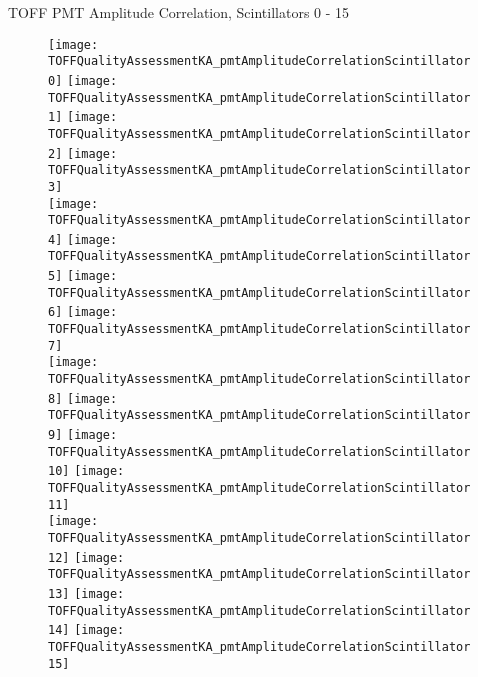 \documentclass[11pt]{beamer}
\begin{document}
\begin{frame}{TOFF PMT Amplitude Correlation, Scintillators 0 - 15}
\begin{figure}
\centering
\texttt{[image: TOFFQualityAssessmentKA\_pmtAmplitudeCorrelationScintillator0]}
\texttt{[image: TOFFQualityAssessmentKA\_pmtAmplitudeCorrelationScintillator1]}
\texttt{[image: TOFFQualityAssessmentKA\_pmtAmplitudeCorrelationScintillator2]}
\texttt{[image: TOFFQualityAssessmentKA\_pmtAmplitudeCorrelationScintillator3]} \\
\texttt{[image: TOFFQualityAssessmentKA\_pmtAmplitudeCorrelationScintillator4]}
\texttt{[image: TOFFQualityAssessmentKA\_pmtAmplitudeCorrelationScintillator5]}
\texttt{[image: TOFFQualityAssessmentKA\_pmtAmplitudeCorrelationScintillator6]}
\texttt{[image: TOFFQualityAssessmentKA\_pmtAmplitudeCorrelationScintillator7]} \\
\texttt{[image: TOFFQualityAssessmentKA\_pmtAmplitudeCorrelationScintillator8]}
\texttt{[image: TOFFQualityAssessmentKA\_pmtAmplitudeCorrelationScintillator9]}
\texttt{[image: TOFFQualityAssessmentKA\_pmtAmplitudeCorrelationScintillator10]}
\texttt{[image: TOFFQualityAssessmentKA\_pmtAmplitudeCorrelationScintillator11]} \\
\texttt{[image: TOFFQualityAssessmentKA\_pmtAmplitudeCorrelationScintillator12]}
\texttt{[image: TOFFQualityAssessmentKA\_pmtAmplitudeCorrelationScintillator13]}
\texttt{[image: TOFFQualityAssessmentKA\_pmtAmplitudeCorrelationScintillator14]}
\texttt{[image: TOFFQualityAssessmentKA\_pmtAmplitudeCorrelationScintillator15]} \\
\end{figure}
\end{frame}
\end{document}
